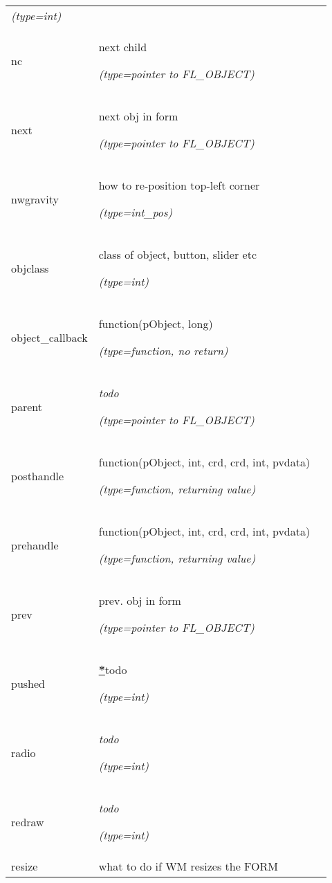 \begin{longtable}{|p{\varnamewidth}|p{\vardescrwidth}|l}
            {\it (type=int)}&\\
\cline{1-2}
\raggedright n\-c\- & \raggedright next child

            {\it (type=pointer to FL\_OBJECT)}&\\
\cline{1-2}
\raggedright n\-e\-x\-t\- & \raggedright next obj in form

            {\it (type=pointer to FL\_OBJECT)}&\\
\cline{1-2}
\raggedright n\-w\-g\-r\-a\-v\-i\-t\-y\- & \raggedright how to re-position top-left corner

            {\it (type=int\_pos)}&\\
\cline{1-2}
\raggedright o\-b\-j\-c\-l\-a\-s\-s\- & \raggedright class of object, button, slider etc

            {\it (type=int)}&\\
\cline{1-2}
\raggedright o\-b\-j\-e\-c\-t\-\_\-c\-a\-l\-l\-b\-a\-c\-k\- & \raggedright function(pObject, long)

            {\it (type=function, no return)}&\\
\cline{1-2}
\raggedright p\-a\-r\-e\-n\-t\- & \raggedright \emph{todo}

            {\it (type=pointer to FL\_OBJECT)}&\\
\cline{1-2}
\raggedright p\-o\-s\-t\-h\-a\-n\-d\-l\-e\- & \raggedright function(pObject, int, crd, crd, int, pvdata)

            {\it (type=function, returning value)}&\\
\cline{1-2}
\raggedright p\-r\-e\-h\-a\-n\-d\-l\-e\- & \raggedright function(pObject, int, crd, crd, int, pvdata)

            {\it (type=function, returning value)}&\\
\cline{1-2}
\raggedright p\-r\-e\-v\- & \raggedright prev. obj in form

            {\it (type=pointer to FL\_OBJECT)}&\\
\cline{1-2}
\raggedright p\-u\-s\-h\-e\-d\- & \raggedright %
\raisebox{1em}{\hypertarget{id2}{}}\hyperlink{id1}{\textbf{\color{red}*}}todo

            {\it (type=int)}&\\
\cline{1-2}
\raggedright r\-a\-d\-i\-o\- & \raggedright \emph{todo}

            {\it (type=int)}&\\
\cline{1-2}
\raggedright r\-e\-d\-r\-a\-w\- & \raggedright \emph{todo}

            {\it (type=int)}&\\
\cline{1-2}
\raggedright r\-e\-s\-i\-z\-e\- & \raggedright what to do if WM resizes the FORM


\end{longtable}
